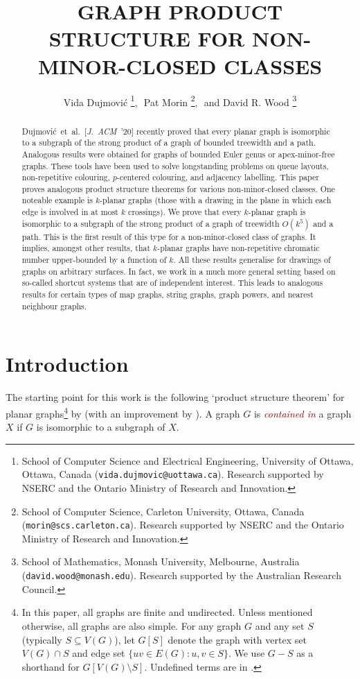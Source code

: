 \documentclass{patmorin}
\title{\MakeUppercase{Graph Product Structure for Non-Minor-Closed Classes}}
\author{%
Vida Dujmovi\'c%
\thanks{School of Computer Science and Electrical Engineering, University of Ottawa, Ottawa, Canada (\texttt{vida.dujmovic@uottawa.ca}). Research supported by NSERC and the Ontario Ministry of Research and Innovation.},\,\,
Pat Morin%
\thanks{School of Computer Science, Carleton University, Ottawa, Canada (\texttt{morin@scs.carleton.ca}). Research  supported by NSERC and the Ontario Ministry of Research and Innovation.},\,\, and
David R. Wood%
\thanks{School of Mathematics, Monash University, Melbourne, Australia (\texttt{david.wood@monash.edu}). Research supported by the Australian Research Council.}
}
\newcommand{\defin}[1]{\textcolor{Maroon}{\emph{#1}}}
\newcommand{\note}[2]{\noindent{\color{red}[#1:~#2]}}
\begin{document}
\begin{titlepage}
\maketitle

\begin{abstract}
Dujmovi\'c~et~al.~[\emph{J.~ACM}~'20] recently proved that every planar graph is isomorphic to a subgraph of the strong product of a graph of bounded treewidth and a path. Analogous results were obtained for graphs of bounded Euler genus or apex-minor-free graphs. These tools have been used to solve longstanding problems on queue layouts, non-repetitive colouring, $p$-centered colouring, and adjacency labelling. This paper proves analogous product structure theorems for various non-minor-closed classes. One noteable example is $k$-planar graphs (those with a drawing in the plane in which each edge is involved in at most $k$ crossings). We prove that every $k$-planar graph is isomorphic to a subgraph of the strong product of a graph of treewidth $O(k^5)$ and a path. This is the first result of this type for a non-minor-closed class of graphs. It implies, amongst other results, that $k$-planar graphs have non-repetitive chromatic number upper-bounded by a function of $k$. All these results generalise for drawings of graphs on arbitrary surfaces. In fact, we work in a much more general setting based on so-called shortcut systems that are of independent interest. This leads to analogous results for certain types of map graphs, string graphs, graph powers, and nearest neighbour graphs.
\end{abstract}
\end{titlepage}
\tableofcontents
\newpage

\section{Introduction}
\label{Introduction}




The starting point for this work is the following `product structure theorem' for planar graphs\footnote{In this paper, all graphs are finite and undirected. Unless mentioned otherwise, all graphs are also simple. For any graph $G$ and any set $S$ (typically $S\subseteq V(G)$), let $G[S]$  denote the graph with vertex set $V(G)\cap S$ and edge set $\{uv\in E(G) : u,v\in S\}$.  We use $G-S$ as a shorthand for $G[V(G)\setminus S]$. Undefined terms are in \citep{Diestel5}.} by \citet{DJMMUW20} (with an improvement by \citet{UWY}). A graph $G$ is \defin{contained in} a graph $X$ if $G$ is isomorphic to a subgraph of $X$.
\end{document}

